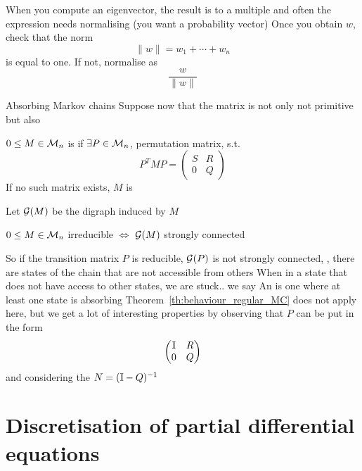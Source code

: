 \documentclass[aspectratio=169]{beamer}
\begin{document}
\begin{frame}
When you compute an eigenvector, the result is to a multiple and often the expression needs normalising (you want a probability vector)
\vfill
Once you obtain $w$, check that the norm 
\[
\|w\|=w_1+\cdots+w_n
\] 
is equal to one. If not, normalise as 
\[
\frac{w}{\|w\|}
\]
\end{frame}


\begin{frame}{Absorbing Markov chains}
Suppose now that the matrix is not only not primitive but also 
\vfill
\begin{definition}
$0\leq M\in\mathcal{M}_n$ is  if $\exists P\in\mathcal{M}_n$, permutation matrix, s.t.
\[
P^TMP =
\begin{pmatrix}
S & R \\ 0 & Q
\end{pmatrix}
\]
If no such matrix exists, $M$ is 
\end{definition}
\vfill
Let $\mathcal{G}(M)$ be the digraph induced by $M$
\begin{theorem}
$0\leq M\in\mathcal{M}_n$ irreducible $\iff$ $\mathcal{G}(M)$ strongly connected
\end{theorem}
\end{frame}

\begin{frame}
So if the transition matrix $P$ is reducible, $\mathcal{G}(P)$ is not strongly connected, \ie, there are states of the chain that are not accessible from others
\vfill
When in a state that does not have access to other states, we are stuck.. we say 
\vfill
An  is one where at least one state is absorbing
\vfill
Theorem~\ref{th:behaviour_regular_MC} does not apply here, but we get a lot of interesting properties by observing that $P$ can be put in the form
\[
\begin{pmatrix}
\mathbb{I}& R \\ 0 & Q
\end{pmatrix}
\]
and considering the  $N=(\mathbb{I}-Q)^{-1}$
\end{frame}

\section{Discretisation of partial differential equations}
\label{sec:discretisation_PDEs}
\end{document}
